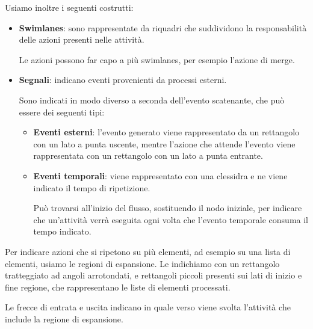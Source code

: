         Usiamo inoltre i seguenti costrutti:
        \begin{itemize}
            \item \textbf{Swimlanes}: sono rappresentate da riquadri che suddividono la responsabilità delle azioni presenti nelle attività.\par
                Le azioni possono far capo a più swimlanes, per esempio l'azione di merge.
            \item \textbf{Segnali}: indicano eventi provenienti da processi esterni.\par
            Sono indicati in modo diverso a seconda dell'evento scatenante, che può essere dei seguenti tipi:
            \begin{itemize}
                \item \textbf{Eventi esterni}: l'evento generato viene rappresentato da un rettangolo con un lato a punta uscente, mentre l'azione che attende l'evento viene rappresentata con un rettangolo con un lato a punta entrante.
                \item \textbf{Eventi temporali}: viene rappresentato con una clessidra e ne viene indicato il tempo di ripetizione.\par
                    Può trovarsi all'inizio del flusso, sostituendo il nodo iniziale, per indicare che un'attività verrà eseguita ogni volta che l'evento temporale consuma il tempo indicato.
            \end{itemize}
        \end{itemize}
        Per indicare azioni che si ripetono su più elementi, ad esempio su una lista di elementi, usiamo le regioni di espansione.
        Le indichiamo con un rettangolo tratteggiato ad angoli arrotondati, e rettangoli piccoli presenti sui lati di inizio e fine regione, che rappresentano le liste di elementi processati.\par
        Le frecce di entrata e uscita indicano in quale verso viene svolta l'attività che include la regione di espansione.



